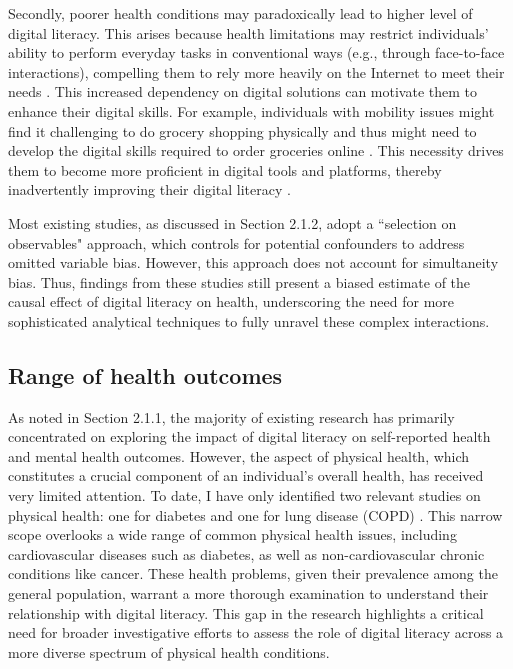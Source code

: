 Secondly, poorer health conditions may paradoxically lead to higher level of digital literacy. This arises because health limitations may restrict individuals' ability to perform everyday tasks in conventional ways (e.g., through face-to-face interactions), compelling them to rely more heavily on the Internet to meet their needs \parencite{domingo_overview_2012}. This increased dependency on digital solutions can motivate them to enhance their digital skills. For example, individuals with mobility issues might find it challenging to do grocery shopping physically and thus might need to develop the digital skills required to order groceries online \parencite{dobransky_disability_2006}. This necessity drives them to become more proficient in digital tools and platforms, thereby inadvertently improving their digital literacy \parencite{drentea_association_2008}. 

Most existing studies, as discussed in Section 2.1.2, adopt a ``selection on observables" approach, which controls for potential confounders to address omitted variable bias. However, this approach does not account for simultaneity bias. Thus, findings from these studies still present a biased estimate of the causal effect of digital literacy on health, underscoring the need for more sophisticated analytical techniques to fully unravel these complex interactions.

\subsection{Range of health outcomes}
As noted in Section 2.1.1, the majority of existing research has primarily concentrated on exploring the impact of digital literacy on self-reported health and mental health outcomes. However, the aspect of physical health, which constitutes a crucial component of an individual's overall health, has received very limited attention. To date, I have only identified two relevant studies on physical health: one for diabetes \parencite{guo_relationships_2021} and one for lung disease (COPD) \parencite{stellefson_association_2019}. This narrow scope overlooks a wide range of common physical health issues, including cardiovascular diseases such as diabetes, as well as non-cardiovascular chronic conditions like cancer. These health problems, given their prevalence among the general population, warrant a more thorough examination to understand their relationship with digital literacy. This gap in the research highlights a critical need for broader investigative efforts to assess the role of digital literacy across a more diverse spectrum of physical health conditions.

